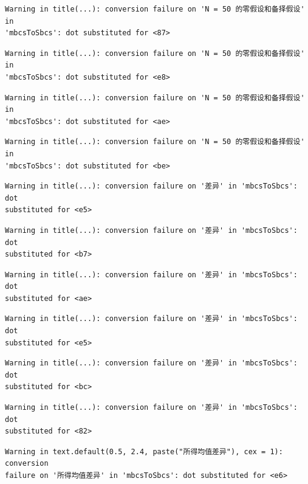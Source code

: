 \documentclass[
  letterpaper,
  DIV=11,
  numbers=noendperiod]{scrreprt}
\begin{document}
\begin{verbatim}
Warning in title(...): conversion failure on 'N = 50 的零假设和备择假设' in
'mbcsToSbcs': dot substituted for <87>
\end{verbatim}

\begin{verbatim}
Warning in title(...): conversion failure on 'N = 50 的零假设和备择假设' in
'mbcsToSbcs': dot substituted for <e8>
\end{verbatim}

\begin{verbatim}
Warning in title(...): conversion failure on 'N = 50 的零假设和备择假设' in
'mbcsToSbcs': dot substituted for <ae>
\end{verbatim}

\begin{verbatim}
Warning in title(...): conversion failure on 'N = 50 的零假设和备择假设' in
'mbcsToSbcs': dot substituted for <be>
\end{verbatim}

\begin{verbatim}
Warning in title(...): conversion failure on '差异' in 'mbcsToSbcs': dot
substituted for <e5>
\end{verbatim}

\begin{verbatim}
Warning in title(...): conversion failure on '差异' in 'mbcsToSbcs': dot
substituted for <b7>
\end{verbatim}

\begin{verbatim}
Warning in title(...): conversion failure on '差异' in 'mbcsToSbcs': dot
substituted for <ae>
\end{verbatim}

\begin{verbatim}
Warning in title(...): conversion failure on '差异' in 'mbcsToSbcs': dot
substituted for <e5>
\end{verbatim}

\begin{verbatim}
Warning in title(...): conversion failure on '差异' in 'mbcsToSbcs': dot
substituted for <bc>
\end{verbatim}

\begin{verbatim}
Warning in title(...): conversion failure on '差异' in 'mbcsToSbcs': dot
substituted for <82>
\end{verbatim}

\begin{verbatim}
Warning in text.default(0.5, 2.4, paste("所得均值差异"), cex = 1): conversion
failure on '所得均值差异' in 'mbcsToSbcs': dot substituted for <e6>
\end{verbatim}
\end{document}
